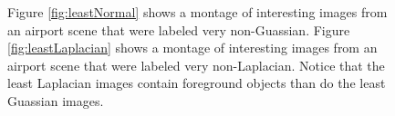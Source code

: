 \begin{figure}
	\centering
	
	
			\caption[Least Gaussian and Least Laplacian Image Montages.]{Figure \ref{fig:leastNormal} shows a montage of interesting images from an airport scene that were labeled very non-Guassian. Figure \ref{fig:leastLaplacian} shows a montage of interesting images from an airport scene that were labeled very non-Laplacian.  Notice that the least Laplacian images contain foreground objects than do the least Guassian images.}
\end{figure}



